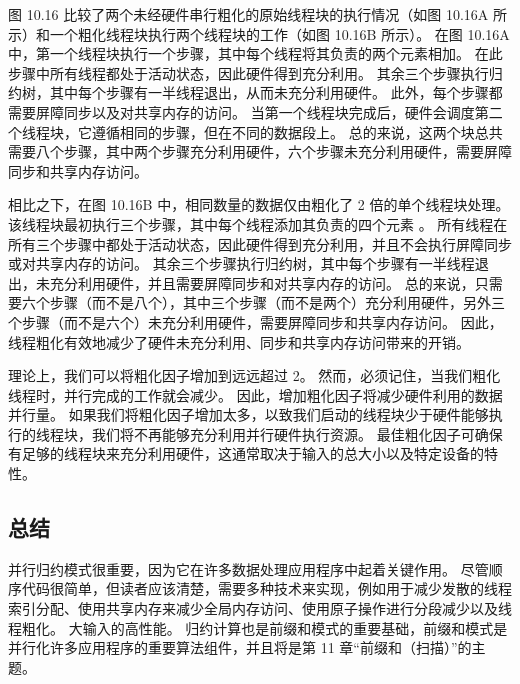 图 10.16 比较了两个未经硬件串行粗化的原始线程块的执行情况（如图 10.16A 所示）和一个粗化线程块执行两个线程块的工作（如图 10.16B 所示）。 在图 10.16A 中，第一个线程块执行一个步骤，其中每个线程将其负责的两个元素相加。 在此步骤中所有线程都处于活动状态，因此硬件得到充分利用。 其余三个步骤执行归约树，其中每个步骤有一半线程退出，从而未充分利用硬件。 此外，每个步骤都需要屏障同步以及对共享内存的访问。 当第一个线程块完成后，硬件会调度第二个线程块，它遵循相同的步骤，但在不同的数据段上。 总的来说，这两个块总共需要八个步骤，其中两个步骤充分利用硬件，六个步骤未充分利用硬件，需要屏障同步和共享内存访问。

相比之下，在图 10.16B 中，相同数量的数据仅由粗化了 2 倍的单个线程块处理。该线程块最初执行三个步骤，其中每个线程添加其负责的四个元素 。 所有线程在所有三个步骤中都处于活动状态，因此硬件得到充分利用，并且不会执行屏障同步或对共享内存的访问。 其余三个步骤执行归约树，其中每个步骤有一半线程退出，未充分利用硬件，并且需要屏障同步和对共享内存的访问。 总的来说，只需要六个步骤（而不是八个），其中三个步骤（而不是两个）充分利用硬件，另外三个步骤（而不是六个）未充分利用硬件，需要屏障同步和共享内存访问。 因此，线程粗化有效地减少了硬件未充分利用、同步和共享内存访问带来的开销。

理论上，我们可以将粗化因子增加到远远超过 2。 然而，必须记住，当我们粗化线程时，并行完成的工作就会减少。 因此，增加粗化因子将减少硬件利用的数据并行量。 如果我们将粗化因子增加太多，以致我们启动的线程块少于硬件能够执行的线程块，我们将不再能够充分利用并行硬件执行资源。 最佳粗化因子可确保有足够的线程块来充分利用硬件，这通常取决于输入的总大小以及特定设备的特性。

\subsection{总结}
并行归约模式很重要，因为它在许多数据处理应用程序中起着关键作用。 尽管顺序代码很简单，但读者应该清楚，需要多种技术来实现，例如用于减少发散的线程索引分配、使用共享内存来减少全局内存访问、使用原子操作进行分段减少以及线程粗化。 大输入的高性能。 归约计算也是前缀和模式的重要基础，前缀和模式是并行化许多应用程序的重要算法组件，并且将是第 11 章“前缀和（扫描）”的主题。
